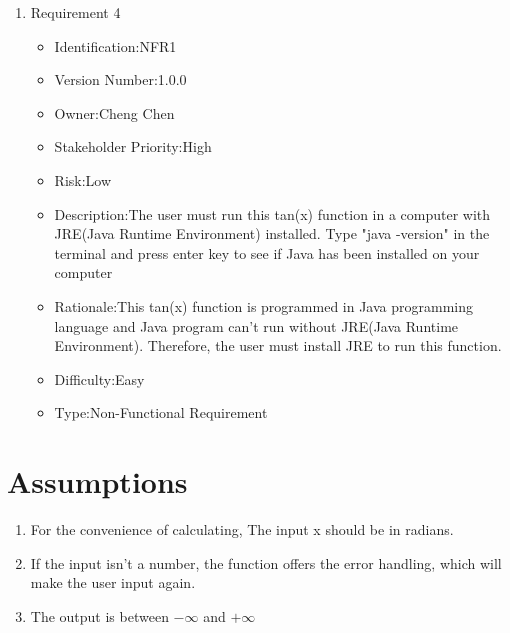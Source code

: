 \documentclass[10pt,a4paper,twoside]{article}
\begin{document}
\begin{enumerate}
\item 
Requirement 4
\begin{itemize}
\item Identification:NFR1
\item Version Number:1.0.0
\item Owner:Cheng Chen
\item Stakeholder Priority:High
\item Risk:Low
\item Description:The user must run this tan(x) function in a computer with JRE(Java Runtime Environment) installed. Type "java -version" in the terminal and press enter key to see if Java has been installed on your computer
\item Rationale:This tan(x) function is programmed in Java programming language and Java program can't run without JRE(Java Runtime Environment). Therefore, the user must install JRE to run this function.
\item Difficulty:Easy
\item Type:Non-Functional Requirement
\end{itemize} 



\end{enumerate}







\section{Assumptions}

\begin{enumerate}
\item 
For the convenience of calculating, The input x should be in radians.
\item
If the input isn't a number, the function offers the error handling, which will make the user input again.
\item
The output is between $-\infty$ and  $+\infty$
\end{enumerate}

\printbibliography
\end{document}
